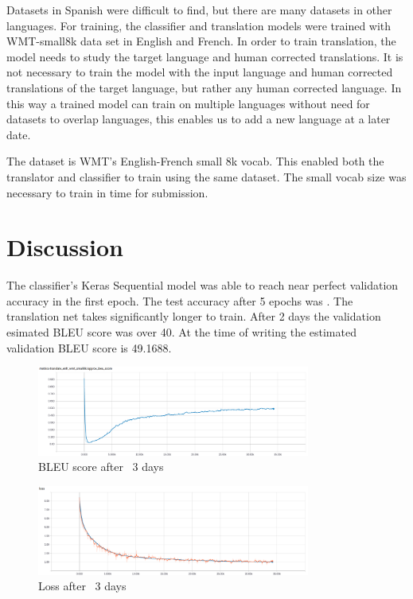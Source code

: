 \documentclass[10pt,a4paper]{article}
\begin{document}
  Datasets in Spanish were difficult to find, but there are many datasets in other languages. For training, the classifier and translation models were trained with WMT-small8k data set in English and French. In order to train translation, the model needs to study the target language and human corrected translations. It is not necessary to train the model with the input language and human corrected translations of the target language, but rather any human corrected language. In this way a trained model can train on multiple languages without need for datasets to overlap languages, this enables us to add a new language at a later date.

  The dataset is WMT's English-French small 8k vocab. This enabled both the translator and classifier to train using the same dataset. The small vocab size was necessary to train in time for submission.

\section{Discussion}
	The classifier's Keras Sequential model was able to reach near perfect validation accuracy in the first epoch. The test accuracy after 5 epochs was .
	The translation net takes significantly longer to train. After 2 days the validation esimated BLEU score was over 40. At the time of writing the estimated validation BLEU score is 49.1688.

\begin{figure}[H]
  \begin{center}
    \includegraphics[width=0.8\textwidth] {BLEU.png}
    \caption{BLEU score after ~3 days}
  \end{center}
\end{figure}

\begin{figure}[H]
  \begin{center}
    \includegraphics[width=0.8\textwidth] {loss.png}
    \caption{Loss after ~3 days}
  \end{center}
\end{figure}
\end{document}
